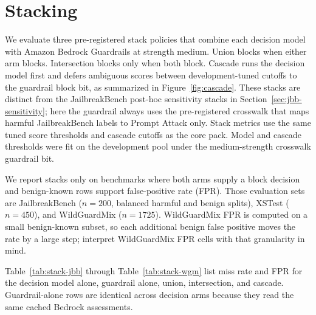 \section{Stacking}
\label{sec:stacking}

We evaluate three pre-registered stack policies that combine each decision model with Amazon Bedrock Guardrails at strength medium.
Union blocks when either arm blocks.
Intersection blocks only when both block.
Cascade runs the decision model first and defers ambiguous scores between development-tuned cutoffs to the guardrail block bit, as summarized in Figure~\ref{fig:cascade}.
These stacks are distinct from the JailbreakBench post-hoc sensitivity stacks in Section~\ref{sec:jbb-sensitivity}; here the guardrail always uses the pre-registered crosswalk that maps harmful JailbreakBench labels to Prompt Attack only.
Stack metrics use the same tuned score thresholds and cascade cutoffs as the core pack.
Model and cascade thresholds were fit on the development pool under the medium-strength crosswalk guardrail bit.

We report stacks only on benchmarks where both arms supply a block decision and benign-known rows support false-positive rate (FPR).
Those evaluation sets are JailbreakBench ($n=200$, balanced harmful and benign splits), XSTest ($n=450$), and WildGuardMix ($n=1725$).
WildGuardMix FPR is computed on a small benign-known subset, so each additional benign false positive moves the rate by a large step; interpret WildGuardMix FPR cells with that granularity in mind.

Table~\ref{tab:stack-jbb} through Table~\ref{tab:stack-wgm} list miss rate and FPR for the decision model alone, guardrail alone, union, intersection, and cascade.
Guardrail-alone rows are identical across decision arms because they read the same cached Bedrock assessments.

